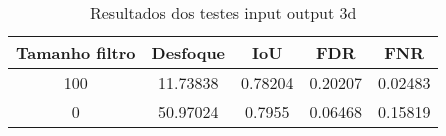 \begin{table}[h]
    \centering
    \caption{Resultados dos testes input output 3d}
    \label{tab:blur_solution_input_output_3d}
    \begin{tabular}{|c|c|c|c|c|}
        \hline
            Tamanho filtro & Desfoque & IoU & FDR & FNR \\
        \hline
            100 & 11.73838 & 0.78204 & 0.20207 & 0.02483\\
            0 & 50.97024 & 0.7955 & 0.06468 & 0.15819\\
        \hline
    \end{tabular}
\end{table}


